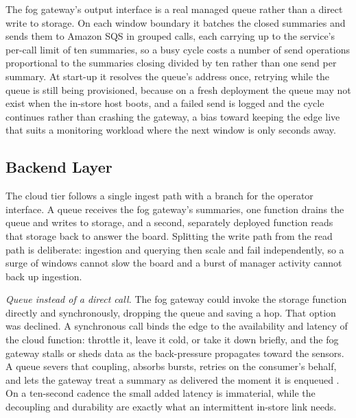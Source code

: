 \documentclass[conference]{IEEEtran}
\begin{document}
The fog gateway's output interface is a real managed queue rather than a direct write to storage. On each window boundary it batches the closed summaries and sends them to Amazon SQS in grouped calls, each carrying up to the service's per-call limit of ten summaries, so a busy cycle costs a number of send operations proportional to the summaries closing divided by ten rather than one send per summary. At start-up it resolves the queue's address once, retrying while the queue is still being provisioned, because on a fresh deployment the queue may not exist when the in-store host boots, and a failed send is logged and the cycle continues rather than crashing the gateway, a bias toward keeping the edge live that suits a monitoring workload where the next window is only seconds away.

\subsection{Backend Layer}

The cloud tier follows a single ingest path with a branch for the operator interface. A queue receives the fog gateway's summaries, one function drains the queue and writes to storage, and a second, separately deployed function reads that storage back to answer the board. Splitting the write path from the read path is deliberate: ingestion and querying then scale and fail independently, so a surge of windows cannot slow the board and a burst of manager activity cannot back up ingestion.

\textit{Queue instead of a direct call.} The fog gateway could invoke the storage function directly and synchronously, dropping the queue and saving a hop. That option was declined. A synchronous call binds the edge to the availability and latency of the cloud function: throttle it, leave it cold, or take it down briefly, and the fog gateway stalls or sheds data as the back-pressure propagates toward the sensors. A queue severs that coupling, absorbs bursts, retries on the consumer's behalf, and lets the gateway treat a summary as delivered the moment it is enqueued \cite{hohpe2003}. On a ten-second cadence the small added latency is immaterial, while the decoupling and durability are exactly what an intermittent in-store link needs.
\end{document}
